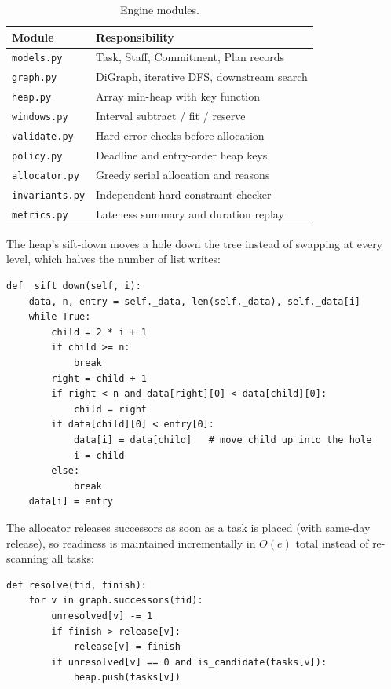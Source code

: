 \documentclass[sigconf,nonacm]{acmart}
\begin{document}
\begin{table}[t]
\centering
\caption{Engine modules.}
\label{tab:modules}
\small
\begin{tabular}{@{}ll@{}}
\toprule
\textbf{Module} & \textbf{Responsibility} \\
\midrule
\texttt{models.py} & Task, Staff, Commitment, Plan records \\
\texttt{graph.py} & DiGraph, iterative DFS, downstream search \\
\texttt{heap.py} & Array min-heap with key function \\
\texttt{windows.py} & Interval subtract / fit / reserve \\
\texttt{validate.py} & Hard-error checks before allocation \\
\texttt{policy.py} & Deadline and entry-order heap keys \\
\texttt{allocator.py} & Greedy serial allocation and reasons \\
\texttt{invariants.py} & Independent hard-constraint checker \\
\texttt{metrics.py} & Lateness summary and duration replay \\
\bottomrule
\end{tabular}
\end{table}

The heap's sift-down moves a hole down the tree instead of swapping at every level, which
halves the number of list writes:

\begin{lstlisting}
def _sift_down(self, i):
    data, n, entry = self._data, len(self._data), self._data[i]
    while True:
        child = 2 * i + 1
        if child >= n:
            break
        right = child + 1
        if right < n and data[right][0] < data[child][0]:
            child = right
        if data[child][0] < entry[0]:
            data[i] = data[child]   # move child up into the hole
            i = child
        else:
            break
    data[i] = entry
\end{lstlisting}

The allocator releases successors as soon as a task is placed (with same-day release),
so readiness is maintained incrementally in $O(e)$ total instead of re-scanning all tasks:

\begin{lstlisting}
def resolve(tid, finish):
    for v in graph.successors(tid):
        unresolved[v] -= 1
        if finish > release[v]:
            release[v] = finish
        if unresolved[v] == 0 and is_candidate(tasks[v]):
            heap.push(tasks[v])
\end{lstlisting}
\end{document}

